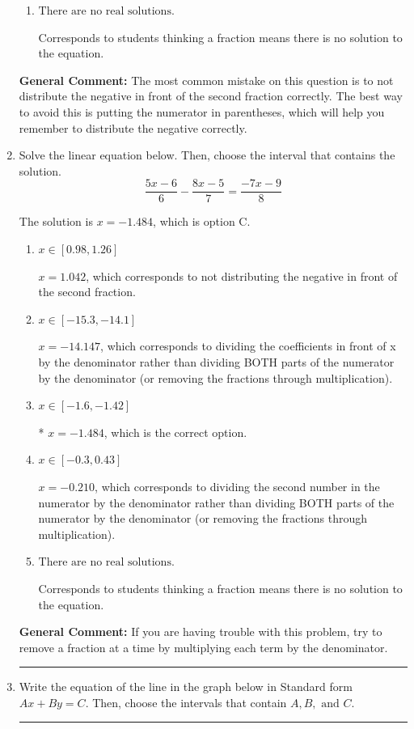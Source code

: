 \documentclass{extbook}[14pt]
\newcommand{\litem}[1]{\item #1

\rule{\textwidth}{0.4pt}}
\begin{document}
\begin{enumerate}
{\begin{enumerate}[label=\Alph*.]
$x = 0.987$, which corresponds to getting the negative of the actual solution.
\item \( \text{There are no real solutions.} \)

Corresponds to students thinking a fraction means there is no solution to the equation.
\end{enumerate}

\textbf{General Comment:} The most common mistake on this question is to not distribute the negative in front of the second fraction correctly. The best way to avoid this is putting the numerator in parentheses, which will help you remember to distribute the negative correctly.
}
\litem{
Solve the linear equation below. Then, choose the interval that contains the solution.
\[ \frac{5x -6}{6} - \frac{8x -5}{7} = \frac{-7x -9}{8} \]

The solution is \( x = -1.484 \), which is option C.\begin{enumerate}[label=\Alph*.]
\item \( x \in [0.98, 1.26] \)

 $x = 1.042$, which corresponds to not distributing the negative in front of the second fraction.
\item \( x \in [-15.3, -14.1] \)

 $x = -14.147$, which corresponds to dividing the coefficients in front of x by the denominator rather than dividing BOTH parts of the numerator by the denominator (or removing the fractions through multiplication).
\item \( x \in [-1.6, -1.42] \)

* $x = -1.484$, which is the correct option.
\item \( x \in [-0.3, 0.43] \)

 $x = -0.210$, which corresponds to dividing the second number in the numerator by the denominator rather than dividing BOTH parts of the numerator by the denominator (or removing the fractions through multiplication).
\item \( \text{There are no real solutions.} \)

Corresponds to students thinking a fraction means there is no solution to the equation.
\end{enumerate}

\textbf{General Comment:} If you are having trouble with this problem, try to remove a fraction at a time by multiplying each term by the denominator.
}
\litem{
Write the equation of the line in the graph below in Standard form $Ax+By=C$. Then, choose the intervals that contain $A, B, \text{ and } C$.

}
\end{enumerate}
\end{document}
